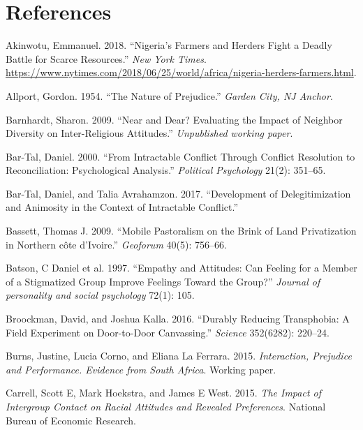 \documentclass[11pt]{article}
\begin{document}
\hypertarget{references}{%
\section*{References}\label{references}}

\hypertarget{refs}{}
\leavevmode\hypertarget{ref-nyt2018nigeria}{}%
Akinwotu, Emmanuel. 2018. ``Nigeria's Farmers and Herders Fight a Deadly
Battle for Scarce Resources.'' \emph{New York Times}.
\url{https://www.nytimes.com/2018/06/25/world/africa/nigeria-herders-farmers.html}.

\leavevmode\hypertarget{ref-allport1954prejudice}{}%
Allport, Gordon. 1954. ``The Nature of Prejudice.'' \emph{Garden City,
NJ Anchor}.

\leavevmode\hypertarget{ref-barnhardt2009near}{}%
Barnhardt, Sharon. 2009. ``Near and Dear? Evaluating the Impact of
Neighbor Diversity on Inter-Religious Attitudes.'' \emph{Unpublished
working paper}.

\leavevmode\hypertarget{ref-bar2000intractable}{}%
Bar-Tal, Daniel. 2000. ``From Intractable Conflict Through Conflict
Resolution to Reconciliation: Psychological Analysis.'' \emph{Political
Psychology} 21(2): 351--65.

\leavevmode\hypertarget{ref-bar2017development}{}%
Bar-Tal, Daniel, and Talia Avrahamzon. 2017. ``Development of
Delegitimization and Animosity in the Context of Intractable Conflict.''

\leavevmode\hypertarget{ref-bassett2009mobile}{}%
Bassett, Thomas J. 2009. ``Mobile Pastoralism on the Brink of Land
Privatization in Northern côte d'Ivoire.'' \emph{Geoforum} 40(5):
756--66.

\leavevmode\hypertarget{ref-batson1997empathy}{}%
Batson, C Daniel et al. 1997. ``Empathy and Attitudes: Can Feeling for a
Member of a Stigmatized Group Improve Feelings Toward the Group?''
\emph{Journal of personality and social psychology} 72(1): 105.

\leavevmode\hypertarget{ref-broockman2016durably}{}%
Broockman, David, and Joshua Kalla. 2016. ``Durably Reducing
Transphobia: A Field Experiment on Door-to-Door Canvassing.''
\emph{Science} 352(6282): 220--24.

\leavevmode\hypertarget{ref-burns2015interaction}{}%
Burns, Justine, Lucia Corno, and Eliana La Ferrara. 2015.
\emph{Interaction, Prejudice and Performance. Evidence from South
Africa}. Working paper.

\leavevmode\hypertarget{ref-carrell2015impact}{}%
Carrell, Scott E, Mark Hoekstra, and James E West. 2015. \emph{The
Impact of Intergroup Contact on Racial Attitudes and Revealed
Preferences}. National Bureau of Economic Research.
\end{document}
